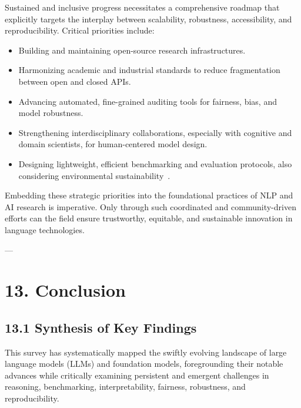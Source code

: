 \documentclass[11pt]{article}
\begin{document}
Sustained and inclusive progress necessitates a comprehensive roadmap that explicitly targets the interplay between scalability, robustness, accessibility, and reproducibility. Critical priorities include:

\begin{itemize}
    \item Building and maintaining open-source research infrastructures.
    \item Harmonizing academic and industrial standards to reduce fragmentation between open and closed APIs.
    \item Advancing automated, fine-grained auditing tools for fairness, bias, and model robustness.
    \item Strengthening interdisciplinary collaborations, especially with cognitive and domain scientists, for human-centered model design.
    \item Designing lightweight, efficient benchmarking and evaluation protocols, also considering environmental sustainability~\cite{ref13,ref34,ref46,ref47,ref55,ref66,ref68,ref70,ref71,ref88,ref101,ref104,ref106,ref107,ref108}.
\end{itemize}

Embedding these strategic priorities into the foundational practices of NLP and AI research is imperative. Only through such coordinated and community-driven efforts can the field ensure trustworthy, equitable, and sustainable innovation in language technologies.

---

\section{13. Conclusion}

\subsection{13.1 Synthesis of Key Findings}

This survey has systematically mapped the swiftly evolving landscape of large language models (LLMs) and foundation models, foregrounding their notable advances while critically examining persistent and emergent challenges in reasoning, benchmarking, interpretability, fairness, robustness, and reproducibility.
\end{document}
